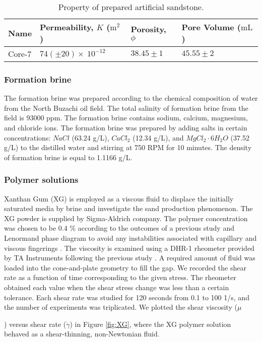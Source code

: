 \documentclass{article}
\begin{document}
{\begin{table}[H]
\fontsize{10}{12}\selectfont \caption{Property of prepared artificial sandstone.}
\begin{centering}
    \begin{tabular}{ p{3cm} p{3cm} p{2cm}  p{3cm} }
\toprule 
Name & Permeability, $K$ ($\mathrm{m^2}$) & Porosity, $\phi$ & Pore Volume ($ \mathrm {mL}$) \\
\midrule
 Core-7 & $74 (\pm{20}) \times\ 10^{-12}$ & $38.45\pm{1}$ & $45.55\pm{2}$ \\
 \bottomrule
\end{tabular}
  \label{tab:pm_parameters}
\par\end{centering}
\end{table}

\subsubsection{Formation brine}

The formation brine was prepared according to the chemical composition of water from the North Buzachi oil field. The total salinity of formation brine from the field is 93000 ppm. The formation brine contains sodium, calcium, magnesium, and chloride ions. The formation brine was prepared by adding salts in certain concentrations: $NaCl$ (63.24 g/L), $CaCl_2$ (12.34 g/L), and $MgCl_2 \cdot 6H_2O$ (37.52 g/L) to the distilled water and stirring at 750 RPM for 10 minutes. The density of formation brine is equal to 1.1166 g/L.

\subsubsection{Polymer solutions}

Xanthan Gum (XG) is employed as a viscous fluid to displace the initially saturated media by brine and investigate the sand production phenomenon. The XG powder is supplied by Sigma-Aldrich company. The polymer concentration was chosen to be 0.4 \% according to the outcomes of a previous study \citep{giese2002using} and Lenormand phase diagram to avoid any instabilities associated with capillary and viscous fingerings \citep{lenormand_touboul_zarcone_1988}. The viscosity is examined using a DHR-1 rheometer provided by TA Instruments following the previous study \citep{omirbekov2023experimental}. A required amount of fluid was loaded into the cone-and-plate geometry to fill the gap. We recorded the shear rate as a function of time corresponding to the given stress. The rheometer obtained each value when the shear stress change was less than a certain tolerance. Each shear rate was studied for 120 seconds from 0.1 to 100 1/s, and the number of experiments was triplicated. We plotted the shear viscosity ($\mu$}) versus shear rate ($\dot{\gamma}$) in Figure \ref{fig:XG}, where the XG polymer solution behaved as a shear-thinning, non-Newtonian fluid.
\end{document}
